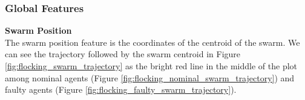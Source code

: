 \documentclass[../../Thesis.tex]{subfiles}
\begin{document}
			\subsubsection{Global Features}
				\textbf{Swarm Position}\\
				The swarm position feature is the coordinates of the centroid of the swarm. We can see the trajectory followed by the swarm centroid in Figure \ref{fig:flocking_swarm_trajectory} as the bright red line in the middle of the plot among nominal agents (Figure \ref{fig:flocking_nominal_swarm_trajectory}) and faulty agents (Figure \ref{fig:flocking_faulty_swarm_trajectory}).
					\begin{figure}
						\centering
						\quad
\end{figure}
\end{document}
